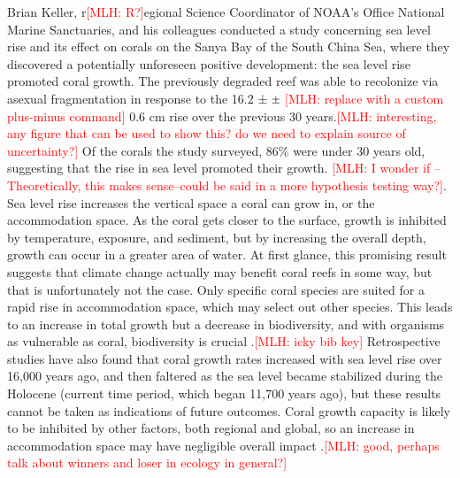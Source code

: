 \documentclass{book}\usepackage{knitr}
\newcommand{\red}[1]{\textcolor{red}{[MLH: #1]}}
\newcommand{\Mypm}{\mathbin{\tikz [x=1.4ex,y=1.4ex,line width=.1ex] \draw (0.0,0) -- (1.0,0) (0.5,0.08) -- (0.5,0.92) (0.0,0.5) -- (1.0,0.5);}}%
\begin{document}
{Brian Keller, r\red{R?}egional Science Coordinator of NOAA's Office National Marine Sanctuaries, and his colleagues conducted a study concerning sea level rise and its effect on corals on the Sanya Bay of the South China Sea, where they discovered a potentially unforeseen positive development: the sea level rise promoted coral growth. The previously degraded reef was able to recolonize via asexual fragmentation in response to the 16.2 ± $\Mypm$ \red{replace with a custom plus-minus command} 0.6 cm rise over the previous 30 years.\red{interesting, any figure that can be used to show this? do we need to explain source of uncertainty?} Of the corals the study surveyed, 86\% were under 30 years old, suggesting that the rise in sea level promoted their growth. \red{I wonder if --Theoretically, this makes sense--could be said in a more hypothesis testing way?}. Sea level rise increases the vertical space a coral can grow in, or the accommodation space. As the coral gets closer to the surface, growth is inhibited by temperature, exposure, and sediment, but by increasing the overall depth, growth can occur in a greater area of water. At first glance, this promising result suggests that climate change actually may benefit coral reefs in some way, but that is unfortunately not the case. Only specific coral species are suited for a rapid rise in accommodation space, which may select out other species. This leads to an increase in total growth but a decrease in biodiversity, and with organisms as vulnerable as coral, biodiversity is crucial \citep{https://doi.org/10.1029/2018JC014534}.\red{icky bib key} Retrospective studies have also found that coral growth rates increased with sea level rise over 16,000 years ago, and then faltered as the sea level became stabilized during the Holocene (current time period, which began 11,700 years ago), but these results cannot be taken as indications of future outcomes. Coral growth capacity is likely to be inhibited by other factors, both regional and global, so an increase in accommodation space may have negligible overall impact \citep{Keller2009ClimateCC}.\red{good, perhaps talk about winners and loser in ecology in general?}

}
\end{document}
